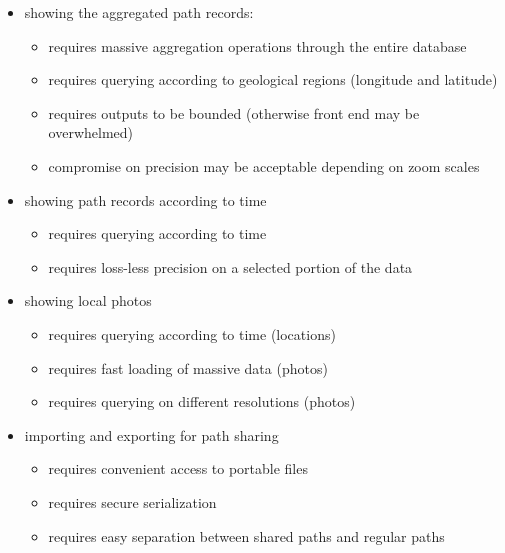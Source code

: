 \documentclass[12pt,a4paper]{article}
\begin{document}
            \begin{itemize}
            \setlength\itemsep{0em}
            \item showing the aggregated path records:
                \begin{itemize}
                    \setlength\itemsep{-0.5em}
                    \item requires massive aggregation operations through the entire database
                    \item requires querying according to geological regions (longitude and latitude)
                    \item requires outputs to be bounded (otherwise front end may be overwhelmed)
                    \item compromise on precision may be acceptable depending on zoom scales
                \end{itemize}
            \item showing path records according to time
                \begin{itemize}
                    \setlength\itemsep{-0.5em}
                    \item requires querying according to time
                    \item requires loss-less precision on a selected portion of the data
                \end{itemize}
            \item showing local photos
                \begin{itemize}
                    \setlength\itemsep{-0.5em}
                    \item requires querying according to time (locations)
                    \item requires fast loading of massive data (photos)
                    \item requires querying on different resolutions (photos)
                \end{itemize}
            \item importing and exporting for path sharing
                \begin{itemize}
                    \setlength\itemsep{-0.5em}
                    \item requires convenient access to portable files
                    \item requires secure serialization
                    \item requires easy separation between shared paths and regular paths
                \end{itemize}
            \end{itemize}
            
\end{document}
